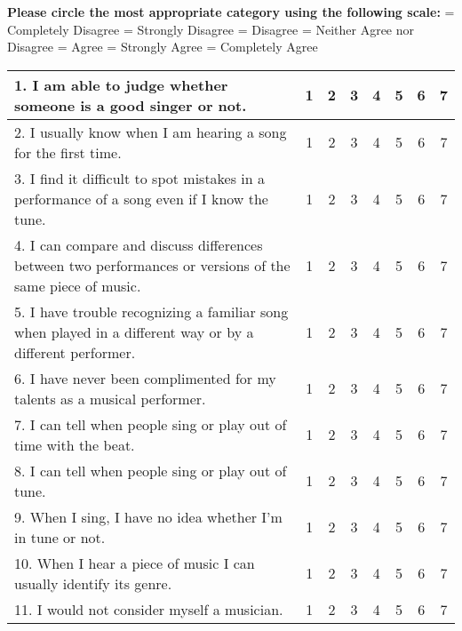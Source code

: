 \documentclass[12pt, a4paper]{article}
\begin{document}
\begin{enumerate}
\newpage
\textbf{Please circle the most appropriate category using the following scale:}
 = Completely Disagree
 = Strongly Disagree
 = Disagree
 = Neither Agree nor Disagree
 = Agree
 = Strongly Agree
 = Completely Agree

\vspace{8pt}

\begin{tabular}{|m{10cm}|c|c|c|c|c|c|c|}
\hline
1. I am able to judge whether someone is a good singer or not. & 1 & 2 & 3 & 4 & 5 & 6 & 7 \\ \hline
2. I usually know when I am hearing a song for the first time. & 1 & 2 & 3 & 4 & 5 & 6 & 7 \\ \hline
3. I find it difficult to spot mistakes in a performance of a song even if I know the tune. & 1 & 2 & 3 & 4 & 5 & 6 & 7 \\ \hline
4. I can compare and discuss differences between two performances or versions of the same piece of music. & 1 & 2 & 3 & 4 & 5 & 6 & 7 \\ \hline
5. I have trouble recognizing a familiar song when played in a different way or by a different performer. & 1 & 2 & 3 & 4 & 5 & 6 & 7 \\ \hline
6. I have never been complimented for my talents as a musical performer. & 1 & 2 & 3 & 4 & 5 & 6 & 7 \\ \hline
7. I can tell when people sing or play out of time with the beat. & 1 & 2 & 3 & 4 & 5 & 6 & 7 \\ \hline
8. I can tell when people sing or play out of tune. & 1 & 2 & 3 & 4 & 5 & 6 & 7 \\[5pt] \hline
9. When I sing, I have no idea whether I'm in tune or not. & 1 & 2 & 3 & 4 & 5 & 6 & 7 \\ \hline
10. When I hear a piece of music I can usually identify its genre. & 1 & 2 & 3 & 4 & 5 & 6 & 7 \\ \hline
11. I would not consider myself a musician. & 1 & 2 & 3 & 4 & 5 & 6 & 7 \\[5pt] \hline
\end{tabular}

\vspace{10pt}
\end{enumerate}
\end{document}
